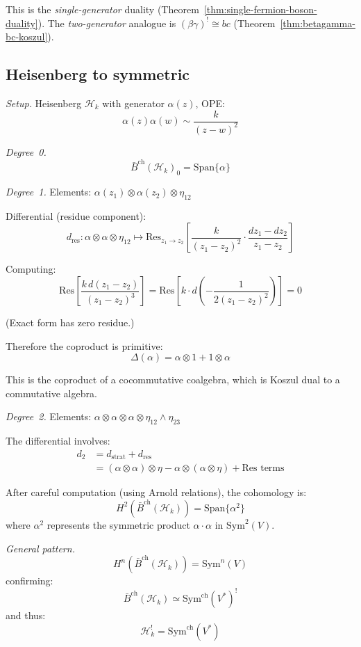 This is the \emph{single-generator} duality (Theorem~\ref{thm:single-fermion-boson-duality}).  The \emph{two-generator} analogue is $(\beta\gamma)^! \cong bc$ (Theorem~\ref{thm:betagamma-bc-koszul}).

\subsection{Heisenberg to symmetric}

\noindent\emph{Setup.} Heisenberg $\mathcal{H}_k$ with generator $\alpha(z)$, OPE:
\[\alpha(z)\alpha(w) \sim \frac{k}{(z-w)^2}\]

\emph{Degree~0.}
\[\bar{B}^{\text{ch}}(\mathcal{H}_k)_0 = \text{Span}\{\alpha\}\]

\emph{Degree~1.}
Elements: $\alpha(z_1) \otimes \alpha(z_2) \otimes \eta_{12}$

Differential (residue component):
\[d_{\text{res}}: \alpha \otimes \alpha \otimes \eta_{12} \mapsto 
   \text{Res}_{z_1 \to z_2}\left[\frac{k}{(z_1-z_2)^2} \cdot \frac{dz_1-dz_2}{z_1-z_2}\right]\]

Computing:
\[\text{Res}\left[\frac{k \, d(z_1-z_2)}{(z_1-z_2)^3}\right] = 
   \text{Res}\left[k \cdot d\left(-\frac{1}{2(z_1-z_2)^2}\right)\right] = 0\]

(Exact form has zero residue.)

Therefore the coproduct is primitive:
\[\Delta(\alpha) = \alpha \otimes 1 + 1 \otimes \alpha\]

This is the coproduct of a cocommutative coalgebra, which is Koszul dual to a
commutative algebra.

\emph{Degree~2.}
Elements: $\alpha \otimes \alpha \otimes \alpha \otimes \eta_{12} \wedge \eta_{23}$

The differential involves:
\begin{align*}
d_2 &= d_{\text{strat}} + d_{\text{res}} \\
&= (\alpha \otimes \alpha) \otimes \eta - \alpha \otimes (\alpha \otimes \eta) + 
    \text{Res terms}
\end{align*}

After careful computation (using Arnold relations), the cohomology is:
\[H^2(\bar{B}^{\text{ch}}(\mathcal{H}_k)) = \text{Span}\{\alpha^2\}\]
where $\alpha^2$ represents the symmetric product $\alpha \cdot \alpha$ in 
$\text{Sym}^2(V)$.

\emph{General pattern.}
\[H^n(\bar{B}^{\text{ch}}(\mathcal{H}_k)) = \text{Sym}^n(V)\]
confirming:
\[\bar{B}^{\text{ch}}(\mathcal{H}_k) \simeq \mathrm{Sym}^{\mathrm{ch}}(V^*)^!\]
and thus:
\[\mathcal{H}_k^! = \mathrm{Sym}^{\mathrm{ch}}(V^*)\]

